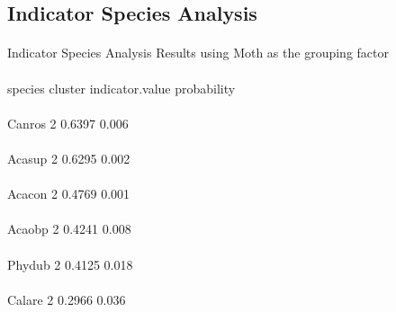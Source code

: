 \documentclass[12pt]{article}
\begin{document}
\subsection{Indicator Species Analysis}

\begin{Schunk}
\end{Schunk}

\paragraph{} Indicator Species Analysis Results using Moth as the grouping factor
\paragraph{} species cluster indicator.value probability
\paragraph{} Canros       2          0.6397       0.006
\paragraph{} Acasup       2          0.6295       0.002
\paragraph{} Acacon       2          0.4769       0.001
\paragraph{} Acaobp       2          0.4241       0.008
\paragraph{} Phydub       2          0.4125       0.018
\paragraph{} Calare       2          0.2966       0.036
\end{document}
